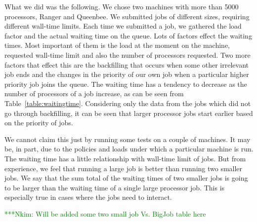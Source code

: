 \documentclass[conference,final]{IEEEtran}
\newcommand{\Nkimnote}[1]{ {\textcolor{green} { ***Nkim: #1 }}}
\newcommand{\Nkimnote}[1]{}
\begin{document}
What we did was the following. We chose two machines with more than 5000 processors, Ranger and Queenbee. We submitted jobs of different sizes, requiring different wall-time limits. Each time we submitted a job, we gathered the load factor and the actual waiting time on the queue. Lots of factors effect the waiting times. Most important of them is the load at the moment on the machine, requested wall-time limit and also the number of processors requested. Two more factors that effect this are the backfilling that occurs when some other irrelevant job ends and the changes in the priority of our own job when a particular higher priority job joins the queue. 
The waiting time has a tendency to decrease as the number of processors of a job increase, as can be seen from Table~\ref{table:waitingtime}.
Considering only the data from the jobs which did not go through backfilling, it can be seen that larger processor jobs start earlier based on the priority of jobs.

We cannot claim this just by running some tests on a couple of machines. It may be, in part, due to the policies and loads under which a particular machine is run. The waiting time has a little relationship with wall-time limit of jobs. But from experience, we feel that running a large job is better than running two smaller jobs. We say that the sum total of the waiting times of two smaller jobs is going to be larger than the waiting time of a single large processor job. This is especially true in cases where the jobs need to interact.

\Nkimnote{Will be added some two small job Vs. BigJob table here}
\end{document}
